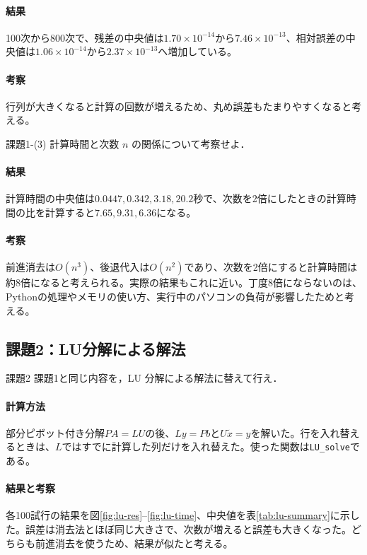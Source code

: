 \documentclass[a4paper,11pt]{article}
\begin{document}
\paragraph{結果}
100次から800次で、残差の中央値は$1.70\times10^{-14}$から$7.46\times10^{-13}$、相対誤差の中央値は$1.06\times10^{-14}$から$2.37\times10^{-13}$へ増加している。

\paragraph{考察}
行列が大きくなると計算の回数が増えるため、丸め誤差もたまりやすくなると考える。

\begin{itembox}[l]{課題1-(3)}
計算時間と次数 $n$ の関係について考察せよ．
\end{itembox}
\paragraph{結果}
計算時間の中央値は$0.0447,0.342,3.18,20.2$秒で、次数を2倍にしたときの計算時間の比を計算すると$7.65,9.31,6.36$になる。

\paragraph{考察}
前進消去は$O(n^3)$、後退代入は$O(n^2)$であり、次数を2倍にすると計算時間は約8倍になると考えられる。実際の結果もこれに近い。丁度8倍にならないのは、Pythonの処理やメモリの使い方、実行中のパソコンの負荷が影響したためと考える。

\subsection{課題2：LU分解による解法}
\begin{itembox}[l]{課題2}
課題1と同じ内容を，LU 分解による解法に替えて行え．
\end{itembox}
\paragraph{計算方法}
部分ピボット付き分解$PA=LU$の後、$Ly=Pb$と$U\tilde x=y$を解いた。行を入れ替えるときは、$L$ではすでに計算した列だけを入れ替えた。使った関数は\texttt{LU\_solve}である。

\paragraph{結果と考察}
各100試行の結果を図\ref{fig:lu-res}--\ref{fig:lu-time}、中央値を表\ref{tab:lu-summary}に示した。誤差は消去法とほぼ同じ大きさで、次数が増えると誤差も大きくなった。どちらも前進消去を使うため、結果が似たと考える。
\end{document}
